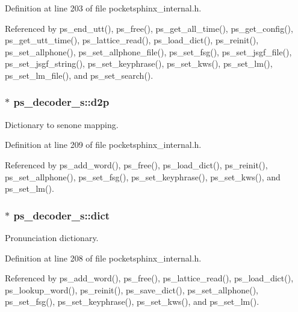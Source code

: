 Definition at line 203 of file pocketsphinx\+\_\+internal.\+h.



Referenced by ps\+\_\+end\+\_\+utt(), ps\+\_\+free(), ps\+\_\+get\+\_\+all\+\_\+time(), ps\+\_\+get\+\_\+config(), ps\+\_\+get\+\_\+utt\+\_\+time(), ps\+\_\+lattice\+\_\+read(), ps\+\_\+load\+\_\+dict(), ps\+\_\+reinit(), ps\+\_\+set\+\_\+allphone(), ps\+\_\+set\+\_\+allphone\+\_\+file(), ps\+\_\+set\+\_\+fsg(), ps\+\_\+set\+\_\+jsgf\+\_\+file(), ps\+\_\+set\+\_\+jsgf\+\_\+string(), ps\+\_\+set\+\_\+keyphrase(), ps\+\_\+set\+\_\+kws(), ps\+\_\+set\+\_\+lm(), ps\+\_\+set\+\_\+lm\+\_\+file(), and ps\+\_\+set\+\_\+search().

\subsubsection[{d2p}]{$\ast$ ps\+\_\+decoder\+\_\+s\+::d2p}\label{structps__decoder__s_ae6515cbc261686f3f3bbd95719f79793}


Dictionary to senone mapping. 



Definition at line 209 of file pocketsphinx\+\_\+internal.\+h.



Referenced by ps\+\_\+add\+\_\+word(), ps\+\_\+free(), ps\+\_\+load\+\_\+dict(), ps\+\_\+reinit(), ps\+\_\+set\+\_\+allphone(), ps\+\_\+set\+\_\+fsg(), ps\+\_\+set\+\_\+keyphrase(), ps\+\_\+set\+\_\+kws(), and ps\+\_\+set\+\_\+lm().

\subsubsection[{dict}]{$\ast$ ps\+\_\+decoder\+\_\+s\+::dict}\label{structps__decoder__s_aef6228c17907cc1d0cef835b238b5d91}


Pronunciation dictionary. 



Definition at line 208 of file pocketsphinx\+\_\+internal.\+h.



Referenced by ps\+\_\+add\+\_\+word(), ps\+\_\+free(), ps\+\_\+lattice\+\_\+read(), ps\+\_\+load\+\_\+dict(), ps\+\_\+lookup\+\_\+word(), ps\+\_\+reinit(), ps\+\_\+save\+\_\+dict(), ps\+\_\+set\+\_\+allphone(), ps\+\_\+set\+\_\+fsg(), ps\+\_\+set\+\_\+keyphrase(), ps\+\_\+set\+\_\+kws(), and ps\+\_\+set\+\_\+lm().

